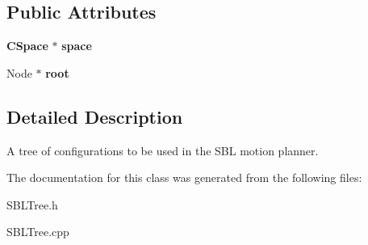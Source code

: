 \subsection*{Public Attributes}
\begin{DoxyCompactItemize}
\item 
{\bf C\+Space} $\ast$ {\bfseries space}\label{classSBLTree_abca592f0e583e6ddc032c8dc65ba0663}

\item 
Node $\ast$ {\bfseries root}\label{classSBLTree_a5a3bfe68e29b679b01266c523f1fcded}

\end{DoxyCompactItemize}


\subsection{Detailed Description}
A tree of configurations to be used in the S\+BL motion planner. 

The documentation for this class was generated from the following files\+:\begin{DoxyCompactItemize}
\item 
S\+B\+L\+Tree.\+h\item 
S\+B\+L\+Tree.\+cpp\end{DoxyCompactItemize}
